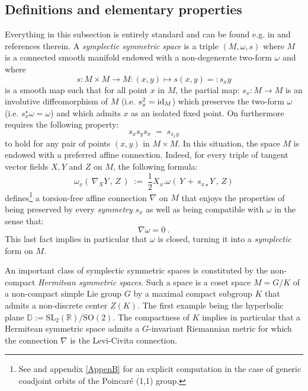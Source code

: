 \documentclass{article}
\newcommand{\DD}{\mathbb D}
\newcommand{\R}{\mathbb R}
\def \R{{\mathbb R}}
\begin{document}
\subsection{Definitions and elementary properties}\label{DefandProp}
Everything in this subsection is entirely standard and can be found e.g. in \cite{Bithese} and references therein.
A {\sl symplectic symmetric space} is a triple $(M,\omega,s)$ where $M$ is a connected smooth manifold
endowed with a non-degenerate two-form $\omega$ and where 
\begin{equation*}
s:M\times M\to M:(x,y)\mapsto s(x,y)=:s_xy
\end{equation*}
is a smooth map such that for all point $x$ in $M$, the partial map:
$s_x:M\to M$ is an involutive  diffeomorphism 
of $M$ (i.e. $s_x^2=\mbox{\rm id}_M$) which preserves the two-form $\omega$ (i.e. $s_x^\star\omega=\omega$)
and which admits $x$ as an isolated fixed point. On furthermore requires the following property:
\begin{equation*}
s_xs_ys_x\;=\;s_{s_xy}
\end{equation*}
to hold for any pair of points $(x,y)$ in $M\times M$.
In this situation, the space $M$ is endowed with a preferred affine connection. Indeed, 
for every triple of tangent vector fields $X,Y$ and $Z$ on $M$,
the following formula:
\begin{equation*}
\omega_x(\,\nabla_XY\,,\,Z\,)\;:=\;\frac12 X_x.\omega(\,Y\,+\,s_{x\star}Y\,,\,Z)
\end{equation*}
defines\footnote{See \cite{Bithese} and appendix \ref{AppenB} for an explicit computation in the case of generic coadjoint orbits of the Poincar\'e (1,1) group.} a torsion-free affine connection $\nabla$ on $M$ that enjoys the properties of being preserved by every 
{\sl symmetry} $s_x$ as well as being compatible with $\omega$ in the sense that:
\begin{equation*}
\nabla\omega=0\;.
\end{equation*}
This last fact implies in particular that $\omega$ is closed, turning it into a {\sl symplectic} form on $M$.

\vspace{2mm}

\noindent An important class of symplectic symmetric spaces is constituted by the non-compact {\sl Hermitean 
symmetric spaces}. Such a space is a coset space $M=G/K$ of a non-compact simple Lie group $G$ by
a maximal compact subgroup $K$ that admits a non-discrete center $Z(K)$. The first example
being the hyperbolic plane $\DD:=\mbox{SL}_2(\R)/\mbox{SO}(2)$.  The compactness of $K$ implies
in particular that a Hermitean symmetric space admits a $G$-invariant Riemannian metric for which
the connection $\nabla$ is the Levi-Civita connection. 
\end{document}
